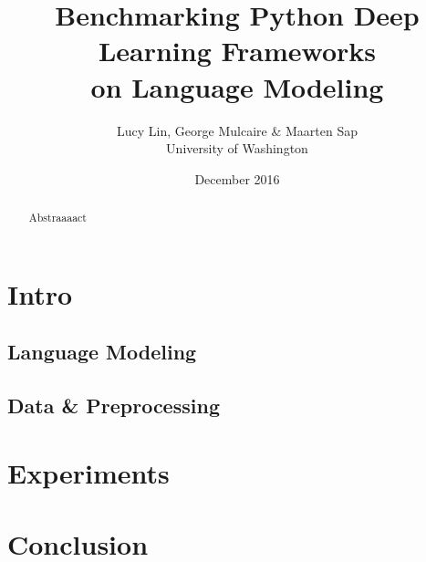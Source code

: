 \documentclass{article}
\title{Benchmarking Python Deep Learning Frameworks\\ on Language Modeling }
\author{Lucy Lin, George Mulcaire \& Maarten Sap
\\University of Washington}
\date{December 2016}
\begin{document}
\maketitle

\begin{abstract}
Abstraaaact
\end{abstract}


\section{Intro}

\subsection{Language Modeling}

\subsection{Data \& Preprocessing}

\section{Experiments}

\section{Conclusion}


\end{document}
